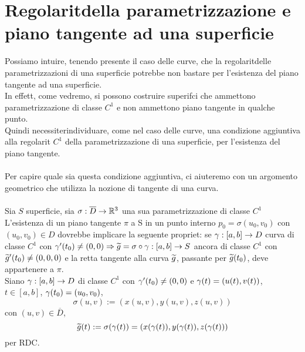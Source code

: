 \section{Regolarit\aca della parametrizzazione e piano tangente ad una superficie}
Possiamo intuire, tenendo presente il caso delle curve, che la regolarit\aca delle parametrizzazioni
di una superficie potrebbe non bastare per l'esistenza del piano tangente ad una superficie. \\
In effett, come vedremo, si possono costruire superifci che ammettono 
parametrizzazione di classe $C^1$ e non ammettono piano tangente in qualche punto.\\
Quindi necessiter\aca individuare, come nel caso delle curve, una condizione aggiuntiva alla regolarit\aca 
$C^1$ della parametrizzazione di una superficie, per l'esistenza del piano tangente. \\\\
Per capire quale sia questa condizione aggiuntiva, ci aiuteremo con un argomento geometrico
che utilizza la nozione di tangente di una curva. \\\\
Sia $S$ superficie, sia $\sigma:\overline{D}\to\mathbb{R}^3$ una sua parametrizzazione di classe $C^1$\\
L'esistenza di un piano tangente $\pi$ a S in un punto interno 
$p_0=\sigma(u_0,v_0)$ con $(u_0,v_0)\in D$ dovrebbe implicare la seguente propriet\aca:
se $\gamma :[a,b]\to D$ curva di classe $C^1$ con $\gamma'(t_0) \neq (0,0) \Rightarrow
\widetilde{g} = \sigma\circ\gamma:[a,b]\to S$ \ace ancora di classe $C^1$ con 
$\widetilde{g}'(t_0)\neq (0,0,0)$ e la retta tangente alla curva $\widetilde{g}$, passante 
per $\widetilde{g}(t_0)$, deve appartenere a $\pi$. \\
Siano $\gamma:[a,b]\to D$ di classe $C^1$ con $\gamma'(t_0)\neq (0,0)$ 
e $\gamma(t) = (u(t),v(t))$, $t\in[a,b]$, $\gamma(t_0)=(u_0,v_0)$, 
$$\sigma(u,v):= (x(u,v),y(u,v),z(u,v))$$ con $(u,v)\in\overline{D}$, 
$$\widetilde{g}(t) := \sigma(\gamma(t)) = (x(\gamma(t)), y(\gamma(t)), z(\gamma(t)))$$ per RDC.
